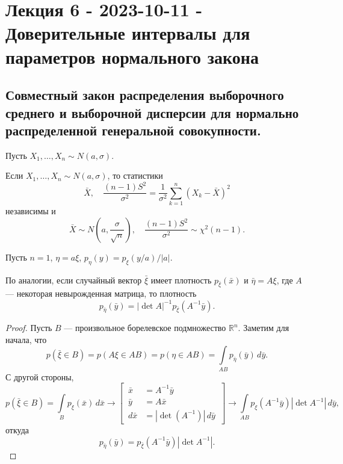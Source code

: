 \section{Лекция 6 - 2023-10-11 - Доверительные интервалы для параметров нормального закона}
\subsection{Совместный закон распределения выборочного среднего и выборочной
дисперсии для нормально распределенной генеральной совокупности.}

Пусть $X_1, \dots, X_n \sim N(a, \sigma)$.

\begin{theorem}
	\label{the:1}
  Если $X_1, \dots, X_n \sim N(a, \sigma)$, то статистики
\[
	\bar X,\quad \frac{(n-1) S^2}{\sigma^2} = \frac{1}{\sigma^2} \sum\limits_{k=1}^n (X_k-\bar X)^2
\]
	независимы и
	\[
		\bar X \sim N\left(a, \frac{\sigma}{\sqrt{n}}\right),\quad \frac{(n-1)
		S^2}{\sigma^2} \sim \chi^2(n-1).
	\]
\end{theorem}

  Пусть $n = 1$, $\eta = a \xi$, $p_\eta(y) = p_\xi(y/a)/|a| $.
\begin{lemma}
  По аналогии, если случайный вектор $ \bar \xi $ имеет плотность $p_{\bar \xi}
	(\bar x)$ и $\bar\eta = A\xi$, где $ A $ --- некоторая невырожденная матрица, то 
	плотность
	\[
		p_{\bar\eta} (\bar y) = |\det A|^{-1} p_{\bar\xi} (A^{-1} \bar y).
	\]
\end{lemma}
\begin{proof}
	Пусть $ B $ --- произвольное борелевское подмножество $ \mathbb R^n $. Заметим
	для начала, что
  \[
		p(\bar\xi \in B) = p(A\xi \in AB) = p(\eta \in AB) = \int\limits_{AB}
		p_{\bar\eta}(\bar y)\,d\bar y.
	\]
	С другой стороны,
  \[ 
		p(\bar \xi \in B) = \int\limits_B p_\xi (\bar x) \, d\bar x
  \to \left[\, \begin{aligned}
    \bar x &= A^{-1} \bar y \\
    \bar y &= A \bar x \\
    d\bar x &= |\det(A^{-1})| \,d\bar y
\end{aligned} \,\right] \to 
  \int\limits_{AB} p_\xi(A^{-1} \bar y) |\det A^{-1}|\, d\bar y ,
\]
откуда  
\[
		p_{\bar \eta} (\bar y)
  = p_{\bar\xi} (A^{-1} \bar y) |\det A^{-1}|.
\]

\end{proof}


